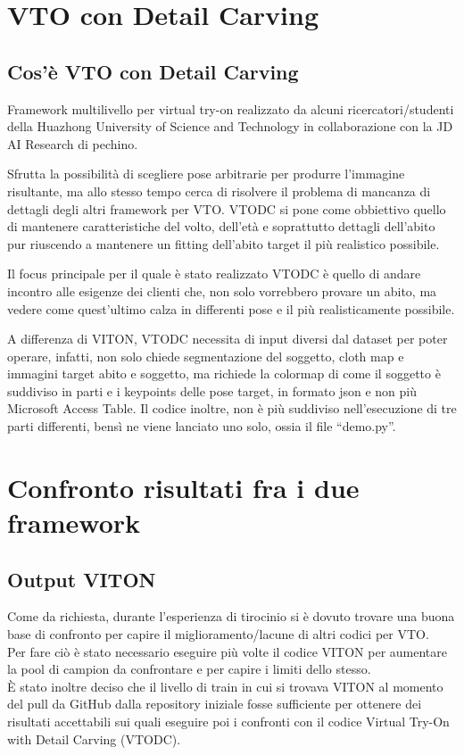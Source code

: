 \documentclass[final, 11pt]{article}
\begin{document}
	\section{VTO con Detail Carving}
	\subsection{Cos'è VTO con Detail Carving}
	Framework multilivello per virtual try-on realizzato da alcuni ricercatori/studenti della Huazhong University of Science and Technology in collaborazione con la JD AI Research di pechino. 
	
	Sfrutta la possibilità di scegliere pose arbitrarie per produrre l’immagine risultante, ma allo stesso tempo cerca di risolvere il problema di mancanza di dettagli degli altri framework per VTO.  VTODC si pone come obbiettivo quello di mantenere caratteristiche del volto, dell’età e soprattutto dettagli dell’abito pur riuscendo a mantenere un fitting dell’abito target il più realistico possibile. 
	
	Il focus principale per il quale è stato realizzato VTODC è quello di andare incontro alle esigenze dei clienti che, non solo vorrebbero provare un abito, ma vedere come quest’ultimo calza in differenti pose e il più realisticamente possibile.
	
	A differenza di VITON, VTODC necessita di input diversi dal dataset per poter operare, infatti, non solo chiede segmentazione del soggetto, cloth map e immagini target abito e soggetto, ma richiede la colormap di come  il soggetto è suddiviso in parti e i keypoints delle pose target, in formato json e non più Microsoft Access Table. Il codice inoltre, non è più suddiviso nell’esecuzione di tre parti differenti, bensì ne viene lanciato uno solo, ossia il file “demo.py”. 
	
	\newpage
	\section{Confronto risultati fra i due framework}
	\subsection{Output VITON}
	Come da richiesta, durante l'esperienza di tirocinio si è dovuto trovare una buona base di confronto per capire il miglioramento/lacune di altri codici per VTO.\\Per fare ciò è stato necessario eseguire più volte il codice VITON per aumentare la pool di campion da confrontare e per capire i limiti dello stesso.\\
	È stato inoltre deciso che il livello di train in cui si trovava VITON al momento del pull da GitHub dalla repository iniziale fosse sufficiente per ottenere dei risultati accettabili sui quali eseguire poi i confronti con il codice Virtual Try-On with Detail Carving (VTODC).\\
	
\end{document}
